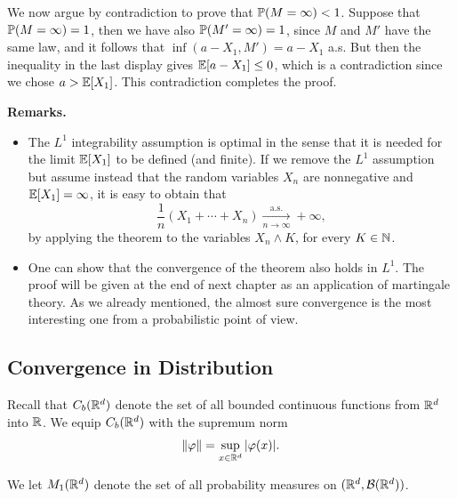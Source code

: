 \documentclass[../Main.tex]{subfiles}
\begin{document}
{We now argue by contradiction to prove that $\mathbb{P}(M = \infty) < 1$. Suppose that $\mathbb{P}(M = \infty) = 1$, then we have also $\mathbb{P}(M' = \infty) = 1$, since $M$ and $M'$ have the same law, and it follows that $\inf(a - X_1, M') = a - X_1$ a.s. But then the inequality in the last display gives $\mathbb{E}[a - X_1] \le 0$, which is a contradiction since we chose $a > \mathbb{E}[X_1]$. This contradiction completes the proof.
}

\textbf{Remarks.}
\begin{itemize}
    \item  The $L^1$ integrability assumption is optimal in the sense that it is needed for the limit $\mathbb{E}[X_1]$ to be defined (and finite). If we remove the $L^1$ assumption but assume instead that the random variables $X_n$ are nonnegative and $\mathbb{E}[X_1] = \infty$, it is easy to obtain that
    \[ \frac{1}{n}(X_1 + \cdots + X_n) \xrightarrow[n \to \infty]{\mathrm{a.s.}} +\infty, \]
    by applying the theorem to the variables $X_n \wedge K$, for every $K \in \mathbb{N}$.

    \item  One can show that the convergence of the theorem also holds in $L^1$. The proof will be given at the end of next chapter as an application of martingale theory. As we already mentioned, the almost sure convergence is the most interesting one from a probabilistic point of view.
\end{itemize}



\subsection{Convergence in Distribution}
Recall that $C_b(\mathbb{R}^d)$ denote the set of all bounded continuous functions from $\mathbb{R}^d$ into $\mathbb{R}$. We equip $C_b(\mathbb{R}^d)$ with the supremum norm
\[ \|\varphi\|=\sup_{x\in\mathbb{R}^d}|\varphi(x)|. \]

We let $M_1(\mathbb{R}^d)$ denote the set of all probability measures on $(\mathbb{R}^d,\mathcal{B}(\mathbb{R}^d))$.

\end{document}
